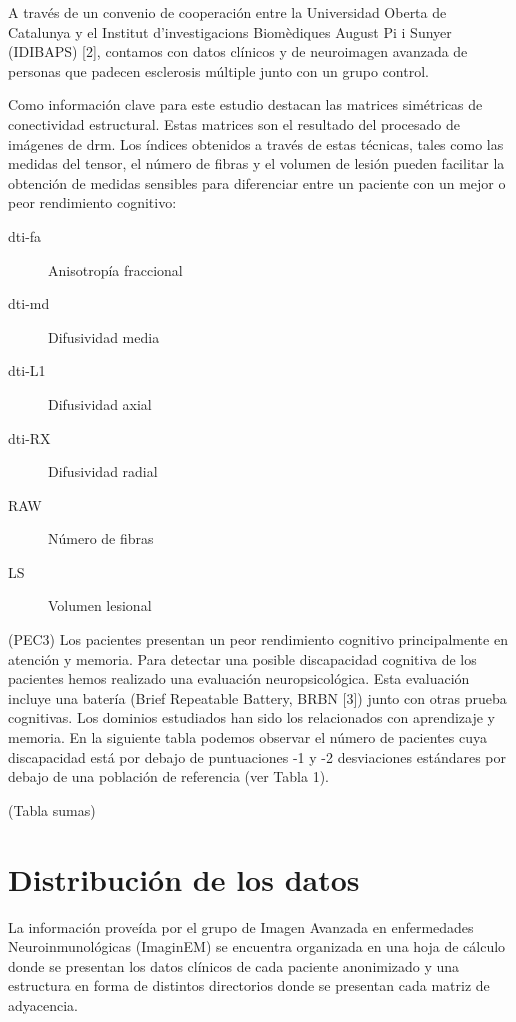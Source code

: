 A través de un convenio de cooperación entre la Universidad Oberta de Catalunya y el Institut d'investigacions Biomèdiques August Pi i Sunyer (IDIBAPS) [2], contamos con datos clínicos y de neuroimagen avanzada de personas que padecen esclerosis múltiple junto con un grupo control.

Como información clave para este estudio destacan las matrices simétricas de conectividad estructural. Estas matrices son el resultado del procesado de imágenes de \gls{drm}. Los índices obtenidos a través de estas técnicas, tales como las medidas del tensor, el número de fibras y el volumen de lesión pueden facilitar la obtención de medidas sensibles para diferenciar entre un paciente con un mejor o peor rendimiento cognitivo:

\begin{description}
 \item [\gls{dti}-\gls{fa}] Anisotropía fraccional
 \item [\gls{dti}-\gls{md}] Difusividad media
 \item [\gls{dti}-L1] Difusividad axial
 \item [\gls{dti}-RX] Difusividad radial
 \item [RAW] Número de fibras
 \item [LS] Volumen lesional
\end{description}


(PEC3) Los pacientes presentan un peor rendimiento cognitivo principalmente en atención y memoria. Para detectar una posible discapacidad cognitiva de los pacientes hemos realizado una evaluación neuropsicológica. Esta evaluación incluye una batería (Brief Repeatable Battery, BRBN [3]) junto con otras prueba cognitivas. Los dominios estudiados han sido los relacionados con aprendizaje y memoria. En la siguiente tabla podemos observar el número de pacientes cuya discapacidad está por debajo de puntuaciones -1 y -2 desviaciones estándares por debajo de una población de referencia (ver Tabla 1).

(Tabla sumas)

\section{Distribución de los datos}

La información proveída por el grupo de Imagen Avanzada en enfermedades Neuroinmunológicas (ImaginEM) \cite{QueNeuroinmunologia} se encuentra organizada en una hoja de cálculo donde se presentan los datos clínicos de cada paciente anonimizado y una estructura en forma de distintos directorios donde se presentan cada matriz de adyacencia.

